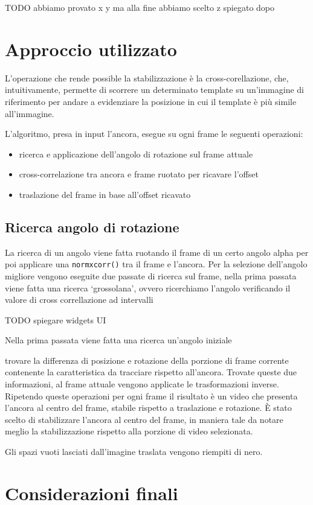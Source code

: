 \documentclass[12pt]{article}
\begin{document}
TODO abbiamo provato x y ma alla fine abbiamo scelto z spiegato dopo

\section{Approccio utilizzato}
L'operazione che rende possible la stabilizzazione è la cross-corellazione, che, intuitivamente, permette di scorrere un determinato template su un'immagine di riferimento per andare a evidenziare la posizione in cui il template è più simile all'immagine.

L'algoritmo, presa in input l'ancora, esegue su ogni frame le seguenti operazioni:
\begin{itemize}
\item ricerca e applicazione dell'angolo di rotazione sul frame attuale
\item cross-correlazione tra ancora e frame ruotato per ricavare l'offset
\item traslazione del frame in base all'offset ricavato
\end{itemize}

\subsection{Ricerca angolo di rotazione}
La ricerca di un angolo viene fatta ruotando il frame di un certo angolo alpha per poi applicare una \texttt{normxcorr()} tra il frame e l'ancora.
Per la selezione dell'angolo migliore vengono eseguite due passate di ricerca sul frame, nella prima passata viene fatta una ricerca `grossolana', ovvero ricerchiamo l'angolo verificando il valore di cross correllazione ad intervalli



TODO spiegare widgets UI

Nella prima passata viene fatta una ricerca un'angolo iniziale




trovare la differenza di posizione e rotazione della porzione di frame corrente contenente la caratteristica da tracciare rispetto all'ancora. Trovate queste due informazioni, al frame attuale vengono applicate le trasformazioni inverse. Ripetendo queste operazioni per ogni frame il risultato è un video che presenta l'ancora al centro del frame, stabile rispetto a traslazione e rotazione.
È stato scelto di stabilizzare l'ancora al centro del frame, in maniera tale da notare meglio la stabilizzazione rispetto alla porzione di video selezionata.

Gli spazi vuoti lasciati dall'imagine traslata vengono riempiti di nero.

\section{Considerazioni finali}
\end{document}
